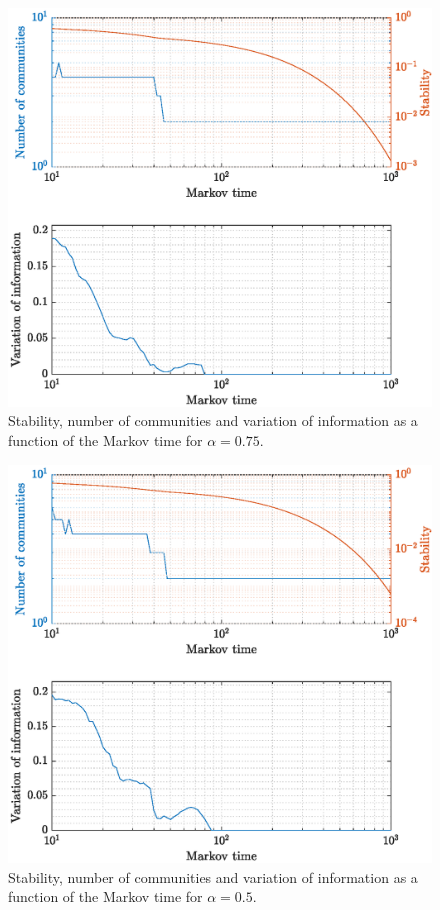 \begin{figure}[!htp]
	\centering
	\includegraphics[width = .7\textwidth, height = .4\textheight]{fig/problem2box/stab_a75.eps}
	\caption{Stability, number of communities and variation of information as a function of the Markov time for $\alpha = 0.75$.}
	\label{fig:staba75}
\end{figure}

\begin{figure}[!htp]
	\centering
	\includegraphics[width = .7\textwidth, height = .4\textheight]{fig/problem2box/stab_a5.eps}
	\caption{Stability, number of communities and variation of information as a function of the Markov time for $\alpha = 0.5$.}
	\label{fig:staba5}
\end{figure}


